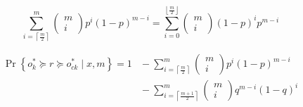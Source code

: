 \xiaosi

\lipsum[1-2]

\begin{equation}
     \sum_{i=\left\lceil\frac{m}{2}\right\rceil}^{m}\left(\begin{array}{c}
     m \\
     i
     \end{array}\right) p^{i}(1-p)^{m-i}=\sum_{i=0}^{\left\lfloor\frac{m}{2}\right\rfloor}\left(\begin{array}{c}
     m \\
     i
     \end{array}\right)(1-p)^{i} p^{m-i}
\end{equation}

\lipsum[1]

\begin{equation}
    \begin{aligned}
        \operatorname{Pr}\left\{o_{k}^{*} \!\succeq \!r\! \succeq \!o_{c k}^{*} \mid x, m\right\}\!=\!1 & \!-\!\sum_{i=\left\lceil\frac{m}{2}\right\rceil}^{m}\!\left(\!\begin{array}{c}
        m \\
        i
        \end{array}\right) p^{i}(1\!-\!p)^{m\!-\!i} \\
        & \!-\!\sum_{i=\left\lceil\frac{m+1}{2}\right\rceil}^{m}\!\left(\!\begin{array}{c}
        m \\
        i
        \end{array}\right) q^{m\!-\!i}(1\!-\!q)^{i}
    \end{aligned}
\end{equation}